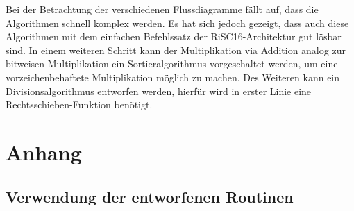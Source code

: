 \documentclass[fleqn, a4paper, 11pt]{article}       %
\begin{document}
Bei der Betrachtung der verschiedenen Flussdiagramme fällt auf, dass die Algorithmen schnell komplex werden. Es hat sich jedoch gezeigt, dass auch diese Algorithmen mit dem einfachen Befehlssatz der RiSC16-Architektur gut lösbar sind. In einem weiteren Schritt kann der Multiplikation via Addition analog zur bitweisen Multiplikation ein Sortieralgorithmus vorgeschaltet werden, um eine vorzeichenbehaftete Multiplikation möglich zu machen. Des Weiteren kann ein Divisionsalgorithmus entworfen werden, hierfür wird in erster Linie eine Rechtsschieben-Funktion benötigt.



%

\newpage
\appendix %
\section{Anhang}
\subsection{Verwendung der entworfenen Routinen \label{A.Man}}
\end{document}
